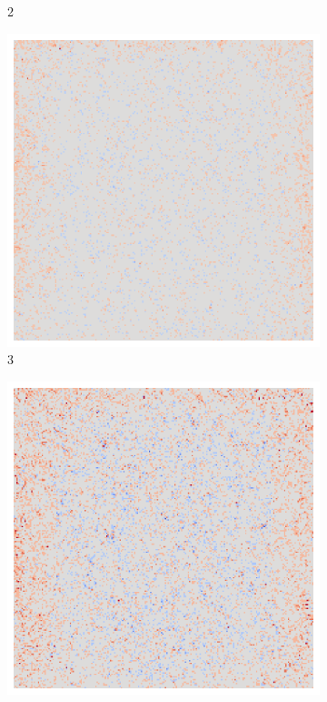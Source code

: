\begin{figure}[ht!]
\begin{subfigure}{0.095\linewidth}
        \caption{2}
    \end{subfigure}\hfill%
    \begin{subfigure}{0.095\linewidth}
        \centering
        \includegraphics[height=1\linewidth]{01-images/05-resultate/uap_resnet/uap0-resnet18-mri-n200-robustificationslevel3.png}
        \caption{3}
    \end{subfigure}\hfill%
    \begin{subfigure}{0.095\linewidth}
        \centering
        \includegraphics[height=1\linewidth]{01-images/05-resultate/uap_resnet/uap0-resnet18-mri-n200-robustificationslevel4.png}

\end{subfigure}
\end{figure}
